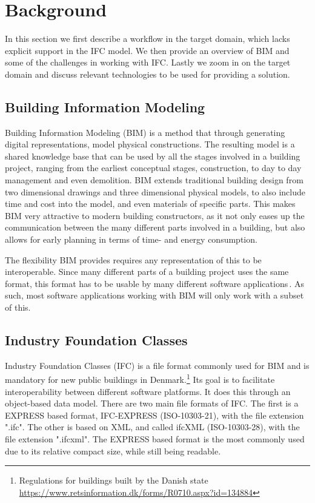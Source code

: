 \section{Background}
In this section we first describe a workflow in the target domain, which lacks explicit support in the IFC model. We then provide an overview of BIM and some of the challenges in working with IFC. Lastly we zoom in on the target domain and discuss relevant technologies to be used for providing a solution.
\subsection{Building Information Modeling}
\label{sec:building_information_modeling}
Building Information Modeling (BIM) is a method that through generating digital representations, model physical constructions. The resulting model is a shared knowledge base that can be used by all the stages involved in a building project, ranging from the earliest conceptual stages, construction, to day to day management and even demolition. BIM extends traditional building design from two dimensional drawings and three dimensional physical models, to also include time and cost into the model, and even materials of specific parts. This makes BIM very attractive to modern building constructors, as it not only eases up the communication between the many different parts involved in a building, but also allows for early planning in terms of time- and energy consumption.

The flexibility BIM provides requires any representation of this to be interoperable. Since many different parts of a building project uses the same format, this format has to be usable by many different software applications\,\cite{quteprints37725}. As such, most software applications working with BIM will only work with a subset of this.
\subsection{Industry Foundation Classes}
Industry Foundation Classes (IFC) is a file format commonly used for BIM and is mandatory for new public buildings in Denmark.\footnote{Regulations for buildings built by the Danish state \url{https://www.retsinformation.dk/forms/R0710.aspx?id=134884}} Its goal is to facilitate interoperability between different software platforms. It does this through an object-based data model. There are two main file formats of IFC. The first is a EXPRESS based format, IFC-EXPRESS (ISO-10303-21), with the file extension ".ifc". The other is based on XML, and called ifcXML (ISO-10303-28), with the file extension ".ifcxml". The EXPRESS based format is the most commonly used due to its relative compact size, while still being readable.

